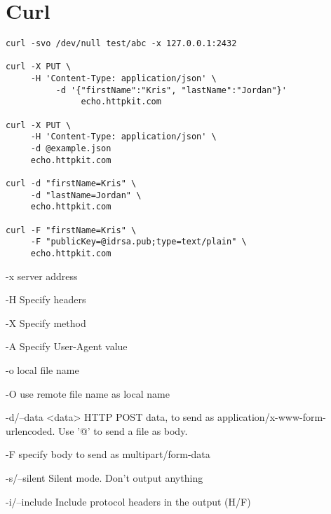 \section{Curl}
 \begin{verbatim}
curl -svo /dev/null test/abc -x 127.0.0.1:2432

curl -X PUT \
     -H 'Content-Type: application/json' \
          -d '{"firstName":"Kris", "lastName":"Jordan"}'
               echo.httpkit.com

curl -X PUT \
     -H 'Content-Type: application/json' \
     -d @example.json
     echo.httpkit.com

curl -d "firstName=Kris" \
     -d "lastName=Jordan" \
     echo.httpkit.com

curl -F "firstName=Kris" \
     -F "publicKey=@idrsa.pub;type=text/plain" \
     echo.httpkit.com

 \end{verbatim}


-x server address

-H Specify headers

-X Specify method

-A Specify User-Agent value

-o local file name

-O use remote file name as local name

 -d/--data <data>   HTTP POST data, to send as
 application/x-www-form-urlencoded. Use '@' to send a file as body.

-F specify body to send as multipart/form-data

-s/--silent        Silent mode. Don't output anything

-i/--include       Include protocol headers in the output (H/F)













